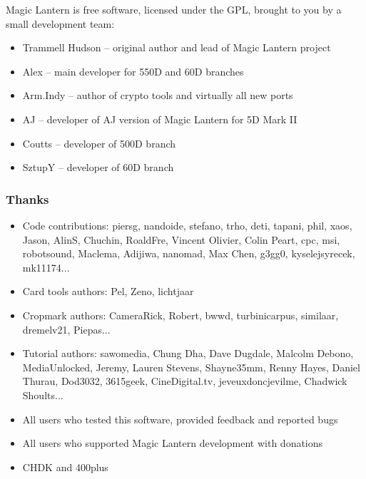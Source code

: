 \documentclass[a4paper,english]{article}
\let\oldsection=\section
\def\section{\newpage\oldsection}
\begin{document}
Magic Lantern is free software, licensed under the GPL, brought to you by a small 
development team:
\begin{itemize}
\item Trammell Hudson -- original author and lead of Magic Lantern project
\item Alex -- main developer for 550D and 60D branches
\item Arm.Indy -- author of crypto tools and virtually all new ports
\item AJ -- developer of AJ version of Magic Lantern for 5D Mark II
\item Coutts -- developer of 500D branch
\item SztupY -- developer of 60D branch
\end{itemize}

\newpage
\subsubsection*{Thanks}

\begin{itemize}
\item Code contributions: piersg, nandoide, stefano, trho, deti, tapani, phil, xaos, Jason, AlinS, Chuchin, RoaldFre, Vincent Olivier, Colin Peart, cpc, msi, robotsound, Maclema, Adijiwa, nanomad, Max Chen, g3gg0, kyselejsyrecek, mk11174...
\item Card tools authors: Pel, Zeno, lichtjaar
\item Cropmark authors: CameraRick, Robert, bwwd, turbinicarpus, similaar, dremelv21, Piepas...
\item Tutorial authors: sawomedia, Chung Dha, Dave Dugdale, Malcolm Debono, MediaUnlocked, Jeremy, Lauren Stevens, Shayne35mm, Renny Hayes, Daniel Thurau, Dod3032, 3615geek, CineDigital.tv, jeveuxdoncjevilme, Chadwick Shoults...
\item All users who tested this software, provided feedback and reported bugs
\item All users who supported Magic Lantern development with donations
\item CHDK and 400plus
\end{itemize}

\newpage

\def\tableofcontents{}

\end{document}

